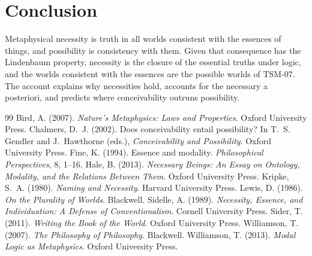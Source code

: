 \documentclass{situationist-preprint}
\begin{document}
\section{Conclusion}

Metaphysical necessity is truth in all worlds consistent with the essences of things, and possibility is consistency with them. Given that consequence has the Lindenbaum property, necessity is the closure of the essential truths under logic, and the worlds consistent with the essences are the possible worlds of TSM-07. The account explains why necessities hold, accounts for the necessary a posteriori, and predicts where conceivability outruns possibility.

\begin{thebibliography}{99}\small
{} Bird, A. (2007). \emph{Nature's Metaphysics: Laws and Properties}. Oxford University Press.
 Chalmers, D.~J. (2002). Does conceivability entail possibility? In T.~S. Gendler and J.~Hawthorne (eds.), \emph{Conceivability and Possibility}. Oxford University Press.
 Fine, K. (1994). Essence and modality. \emph{Philosophical Perspectives}, 8, 1--16.
 Hale, B. (2013). \emph{Necessary Beings: An Essay on Ontology, Modality, and the Relations Between Them}. Oxford University Press.
 Kripke, S.~A. (1980). \emph{Naming and Necessity}. Harvard University Press.
 Lewis, D. (1986). \emph{On the Plurality of Worlds}. Blackwell.
 Sidelle, A. (1989). \emph{Necessity, Essence, and Individuation: A Defense of Conventionalism}. Cornell University Press.
 Sider, T. (2011). \emph{Writing the Book of the World}. Oxford University Press.
 Williamson, T. (2007). \emph{The Philosophy of Philosophy}. Blackwell.
 Williamson, T. (2013). \emph{Modal Logic as Metaphysics}. Oxford University Press.
\end{thebibliography}
\end{document}
